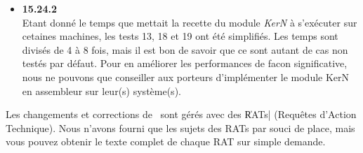 \begin {enumerate}
\begin {itemize}
\item {\bf 15.24.2} \\
Etant donn\'{e} le temps que mettait la recette du module {\it
KerN} \`{a} s'ex\'{e}cuter sur cetaines machines, les tests 13, 18 et 19 ont
\'{e}t\'{e} simplifi\'{e}s. Les temps sont divis\'{e}s de 4 \`{a} 8 fois, mais 
il est bon de savoir que ce sont autant de cas non test\'{e}s par
d\'{e}faut. Pour en am\'{e}liorer les performances de facon significative,
nous ne pouvons que conseiller aux porteurs d'impl\'{e}menter le
module KerN en assembleur sur leur(s) syst\`{e}me(s).

\end {itemize}

\end{enumerate}


Les changements et corrections de \LeLisp\ sont g\'{e}r\'{e}s avec des \|RATs|
(Requ\^{e}tes d'Action Technique).  Nous n'avons fourni que les sujets
des RATs par souci de place, mais vous pouvez obtenir le texte complet
de chaque RAT sur simple demande.

